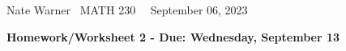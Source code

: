 \documentclass{report}
\title{\Huge{}}
\author{\huge{Nathan Warner}}
\date{\huge{}}
\begin{document}
    \pagebreak \bigbreak \noindent
    Nate Warner \ \quad \quad \quad \quad \quad \quad \quad \quad \quad \quad \quad \quad \quad \quad \quad \quad \quad  MATH 230 \quad  \quad \quad \quad \quad \quad \quad \quad \quad \ \ \quad \quad September 06, 2023
    \begin{center}
        \textbf{Homework/Worksheet 2 - Due: Wednesday, September 13}
    \end{center}
    
    
\end{document}
